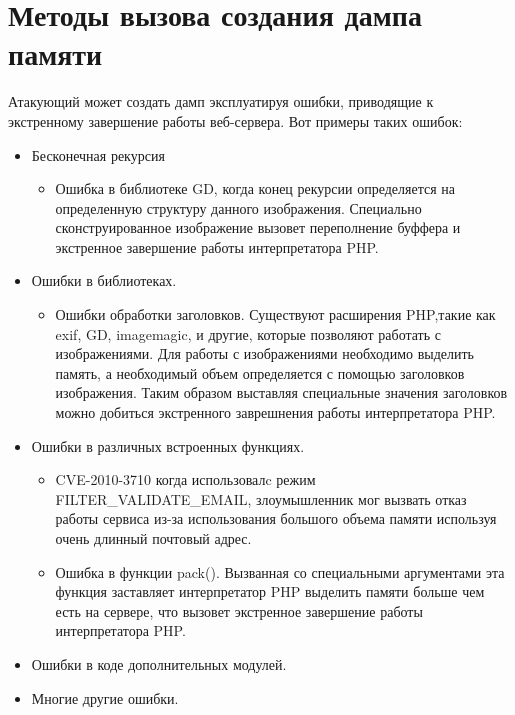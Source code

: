 \documentclass[20pt]{article}
\begin{document}
\newpage

\section{Методы вызова создания дампа памяти}

Атакующий может создать дамп эксплуатируя ошибки, приводящие к экстренному
завершение работы веб-сервера. Вот примеры таких ошибок:
\begin{itemize} \cite{php-crash}
  \item  Бесконечная рекурсия
    \begin{itemize}
      \item Ошибка в библиотеке GD, когда конец рекурсии определяется на определенную
      структуру данного изображения. Специально сконструированное изображение вызовет
      переполнение буффера и экстренное завершение работы интерпретатора PHP.
    \end{itemize}
  \item Ошибки в библиотеках.
    \begin{itemize}
      \item Ошибки обработки заголовков. Существуют расширения PHP,такие как exif, GD,
        imagemagic, и другие, которые позволяют работать с изображениями. Для работы
        с изображениями необходимо выделить память, а необходимый объем определяется
        с помощью заголовков изображения. Таким образом выставляя специальные значения
        заголовков можно добиться экстренного заврешнения работы интерпретатора PHP.
    \end{itemize}
  \item Ошибки в различных встроенных функциях.
    \begin{itemize}
      \item CVE-2010-3710\cite{cve-2010-3710} когда использовалc режим
      FILTER\_VALIDATE\_EMAIL, злоумышленник мог вызвать отказ работы сервиса
      из-за использования большого объема памяти используя очень длинный почтовый адрес.
      \item Ошибка в функции pack(). Вызванная со специальными аргументами эта функция
        заставляет интерпретатор PHP выделить памяти больше чем есть на сервере, что
        вызовет экстренное завершение работы интерпретатора PHP.
    \end{itemize}
 \item Ошибки в коде дополнительных модулей.
 \item Многие другие ошибки.
\end{itemize}
\end{document}
